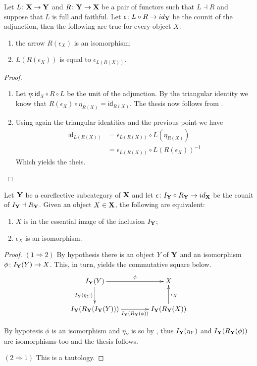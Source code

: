 \documentclass[a4paper,UKenglish,cleveref,pdftex,thm-restate,numberwithinsect]{lipics-v2021}
\newcommand{\id}[1]{\mathsf{id}_{#1}}
\def\X{\textbf {\textup{X}}}
\def\Y{\textbf {\textup{Y}}}
\begin{document}
\begin{corollary}\label{cor:cou}
Let $L\colon \X\to \Y$ and $R\colon \Y \to \X$ be a pair of functors such that $L\dashv R$ and suppose that $L$ is full and faithful. Let $\epsilon\colon L\circ R\to \id{\Y}$ be the counit of the adjunction, then the following are true for every object $X$:
\begin{enumerate}
	\item the arrow $R(\epsilon_X)$ is an isomorphism;
	\item $L(R(\epsilon_X))$ is equal to $\epsilon_{L(R(X))}$.
\end{enumerate}
\end{corollary}
\begin{proof}
	\begin{enumerate}
		\item Let $\eta\colon \id{X}\circ R\circ L$ be the unit of the adjunction. By the triangular identity we know that $R(\epsilon_X)\circ \eta_{R(X)}=\id{R(X)}$. The thesis now follows from .
		\item Using again the triangular identities and the previous point we have
		\begin{align*}
			\id{L(R(X))}&=\epsilon_{L(R(X))}\circ L(\eta_{R(X)})\\&= \epsilon_{L(R(X))}\circ L(R(\epsilon_X))^{-1}
		\end{align*}
		Which yields the theis. \qedhere 
	\end{enumerate}
\end{proof}

\begin{corollary}\label{cor:counit}
	Let $\Y$ be a coreflective subcategory of $\X$ and let $\epsilon \colon I_\Y\circ R_\Y \to  \id{\X}$ be the counit of $I_\Y\dashv R_\Y$. Given an object $X\in \X$, the following are equivalent:
	\begin{enumerate}
		\item $X$ is in the essential image of the inclusion $I_\Y$;
		\item $\epsilon_X$ is an isomorphism.
	\end{enumerate} 
\end{corollary}
\begin{proof}
	$(1\Rightarrow 2)$ By hypothesis there is an object $Y$ of $\Y$ and an isomorphism $\phi\colon I_\Y(Y)\to X$. This, in turn, yields the commutative square below.
	\[\xymatrix@C=40pt{I_\Y(Y) \ar[r]^-{\phi} \ar[d]_{I_\Y(\eta_Y)}&  X\\ I_\Y(R_\Y(I_\Y(Y)))  \ar[r]_-{I_\Y(R_\Y(\phi))}& I_\Y(R_\Y(X)) \ar[u]_{\epsilon_X}}\]
	
	By hypotesis $\phi$ is an isomorphism and $\eta_Y$ is so by , thus $I_\Y(\eta_Y)$ and 
	$I_\Y(R_\Y(\phi))$ are isomorphisms too and the thesis follows.
	
	\smallskip \noindent
	$(2\Rightarrow 1)$ This is a tautology.
\end{proof}
\end{document}
